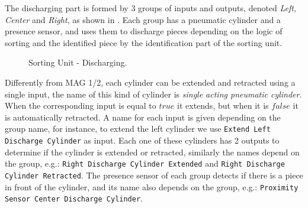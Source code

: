 The discharging part is formed by 3 groups of inputs and outputs, denoted \emph{Left}, \emph{Center} and
\emph{Right}, as shown in . 
Each group has a pneumatic cylinder and a presence sensor, and uses them to discharge pieces
depending on the logic of sorting and the identified piece by the identification
part of the sorting unit.
\begin{figure}[H]
  \centering
  \caption{Sorting Unit - Discharging.}
  \label{fig:sortDisc}
\end{figure}
Differently from MAG 1/2, each cylinder can be extended and retracted
using a single input, the name of this kind of cylinder is \emph{
single acting pneumatic cylinder}. When the corresponding input is equal to $true$ it
extends, but when it is $false$ it is automatically retracted.
A name for each input is given depending on the group name, for
instance, to extend the left cylinder we use
\verb|Extend Left Discharge Cylinder| as input.
Each one of these cylinders has 2 outputs to determine if the cylinder is
extended or retracted, similarly the names depend on the group, e.g.:
\verb|Right Discharge Cylinder Extended| and
\verb|Right Discharge Cylinder Retracted|.
The presence sensor of each group detects if there is a piece in front of the
cylinder, and its name also depends on the group, e.g.:
\verb|Proximity Sensor Center Discharge Cylinder|.

